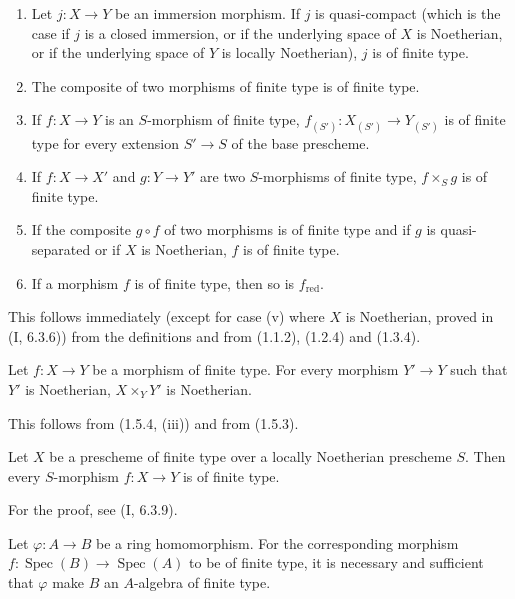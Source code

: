 \begin{proposition}[1.5.4]
\label{IV.1.5.4}
\begin{enumerate}
  \item[(i)] Let $j:X\to Y$ be an immersion morphism. If $j$ is
  quasi-compact (which is the case if $j$ is a closed immersion, or if
  the underlying space of $X$ is Noetherian, or if the underlying space of
  $Y$ is locally Noetherian), $j$ is of finite type.
  \item[(ii)] The composite of two morphisms of finite type is of finite type.
  \item[(iii)] If $f:X\to Y$ is an $S$-morphism of finite type,
  $f_{(S')}:X_{(S')}\to Y_{(S')}$ is of finite type for every extension
  $S'\to S$ of the base prescheme.
  \item[(iv)] If $f:X\to X'$ and $g:Y\to Y'$ are two $S$-morphisms of finite
  type, $f\times_Sg$ is of finite type.
  \item[(v)] If the composite $g\circ f$ of two morphisms is of finite type
  and if $g$ is quasi-separated or if $X$ is Noetherian, $f$ is of finite type.
  \item[(vi)] If a morphism $f$ is of finite type, then so is
  $f_{\mathrm{red}}$.
\end{enumerate}
\end{proposition}

This follows immediately (except for case (v) where $X$ is Noetherian, proved
in (I, 6.3.6)) from the definitions and from (1.1.2), (1.2.4) and (1.3.4).

\begin{corollary}[1.5.5]
\label{IV.1.5.5}
Let $f:X\to Y$ be a morphism of finite type. For every morphism $Y'\to Y$
such that $Y'$ is Noetherian, $X\times_YY'$ is Noetherian.
\end{corollary}

This follows from (1.5.4, (iii)) and from (1.5.3).

\begin{corollary}[1.5.6]
\label{IV.1.5.6}
Let $X$ be a prescheme of finite type over a locally Noetherian prescheme $S$.
Then every $S$-morphism $f:X\to Y$ is of finite type.
\end{corollary}

For the proof, see (I, 6.3.9).

\begin{proposition}[1.5.7]
\label{IV.1.5.7}
Let $\varphi:A\to B$ be a ring homomorphism. For the corresponding
morphism $f:\operatorname{Spec}(B)\to\operatorname{Spec}(A)$ to be of finite type, it is necessary and
sufficient that $\varphi$ make $B$ an $A$-algebra of finite type.
\end{proposition}

